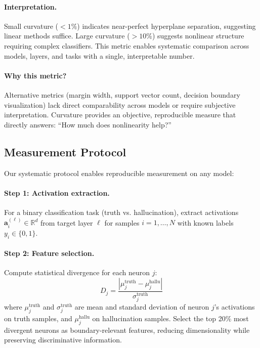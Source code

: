 \documentclass[11pt]{article}
\begin{document}
\paragraph{Interpretation.} Small curvature ($<1\%$) indicates near-perfect hyperplane separation, suggesting linear methods suffice. Large curvature ($>10\%$) suggests nonlinear structure requiring complex classifiers. This metric enables systematic comparison across models, layers, and tasks with a single, interpretable number.

\paragraph{Why this metric?} Alternative metrics (margin width, support vector count, decision boundary visualization) lack direct comparability across models or require subjective interpretation. Curvature provides an objective, reproducible measure that directly answers: ``How much does nonlinearity help?''

\subsection{Measurement Protocol}
Our systematic protocol enables reproducible measurement on any model:

\paragraph{Step 1: Activation extraction.} For a binary classification task (truth vs. hallucination), extract activations $\mathbf{a}^{(\ell)}_i \in \mathbb{R}^d$ from target layer $\ell$ for samples $i = 1, \ldots, N$ with known labels $y_i \in \{0, 1\}$.

\paragraph{Step 2: Feature selection.} Compute statistical divergence for each neuron $j$:
\begin{equation}
D_j = \frac{|\mu^{\text{truth}}_j - \mu^{\text{hallu}}_j|}{\sigma^{\text{truth}}_j}
\end{equation}
where $\mu^{\text{truth}}_j$ and $\sigma^{\text{truth}}_j$ are mean and standard deviation of neuron $j$'s activations on truth samples, and $\mu^{\text{hallu}}_j$ on hallucination samples. Select the top 20\% most divergent neurons as boundary-relevant features, reducing dimensionality while preserving discriminative information.
\end{document}
